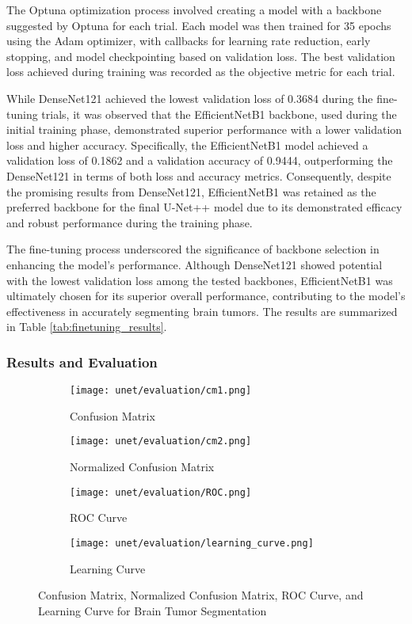 The Optuna optimization process involved creating a model with a backbone suggested by Optuna for each trial. Each model was then trained for 35 epochs using the Adam optimizer, with callbacks for learning rate reduction, early stopping, and model checkpointing based on validation loss. The best validation loss achieved during training was recorded as the objective metric for each trial.

While DenseNet121 achieved the lowest validation loss of 0.3684 during the fine-tuning trials, it was observed that the EfficientNetB1 backbone, used during the initial training phase, demonstrated superior performance with a lower validation loss and higher accuracy. Specifically, the EfficientNetB1 model achieved a validation loss of 0.1862 and a validation accuracy of 0.9444, outperforming the DenseNet121 in terms of both loss and accuracy metrics. Consequently, despite the promising results from DenseNet121, EfficientNetB1 was retained as the preferred backbone for the final U-Net++ model due to its demonstrated efficacy and robust performance during the training phase.

The fine-tuning process underscored the significance of backbone selection in enhancing the model's performance. Although DenseNet121 showed potential with the lowest validation loss among the tested backbones, EfficientNetB1 was ultimately chosen for its superior overall performance, contributing to the model's effectiveness in accurately segmenting brain tumors. The results are summarized in Table \ref{tab:finetuning_results}.

\subsubsection{Results and Evaluation}

\begin{figure}[H]
  \centering
  \begin{subfigure}[b]{0.2\textwidth}
    \centering
    \texttt{[image: unet/evaluation/cm1.png]}
    \caption{Confusion Matrix}
    \label{fig:unet_cm1}
  \end{subfigure}
  \hfill
  \begin{subfigure}[b]{0.2\textwidth}
    \centering
    \texttt{[image: unet/evaluation/cm2.png]}
    \caption{Normalized Confusion Matrix}
    \label{fig:unet_cm2}
  \end{subfigure}
  \hfill
  \begin{subfigure}[b]{0.25\textwidth}
    \centering
    \texttt{[image: unet/evaluation/ROC.png]}
    \caption{ROC Curve}
    \label{fig:unet_roc}
  \end{subfigure}
  \hfill
  \begin{subfigure}[b]{0.25\textwidth}
    \centering
    \texttt{[image: unet/evaluation/learning\_curve.png]}
    \caption{Learning Curve}
    \label{fig:unet_learning_curve}
  \end{subfigure}
  \caption{Confusion Matrix, Normalized Confusion Matrix, ROC Curve, and Learning Curve for Brain Tumor Segmentation}
  \label{fig:unet_evaluation}
\end{figure}

